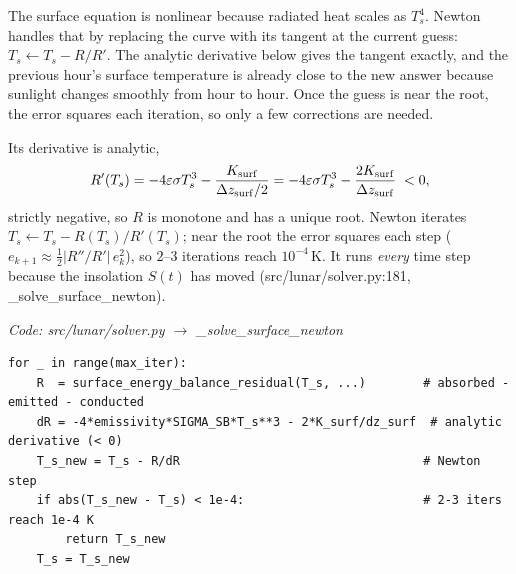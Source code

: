 \documentclass[11pt]{report}
\newcommand{\code}[1]{{\ttfamily\small #1}}
\begin{document}
\begin{plain}
The surface equation is nonlinear because radiated heat scales as $T_s^4$. Newton
handles that by replacing the curve with its tangent at the current guess:
$T_s\leftarrow T_s-R/R'$. The analytic derivative below gives the tangent
exactly, and the previous hour's surface temperature is already close to the new
answer because sunlight changes smoothly from hour to hour. Once the guess is
near the root, the error squares each iteration, so only a few corrections are
needed.
\end{plain}

Its derivative is analytic,
\[
R'(T_s)=-4\varepsilon\sigma T_s^3-\frac{K_{\rm surf}}{\Delta z_{\rm surf}/2}
=-4\varepsilon\sigma T_s^3-\frac{2K_{\rm surf}}{\Delta z_{\rm surf}}\;<0,
\]
strictly negative, so $R$ is monotone and has a unique root. Newton iterates
$T_s\leftarrow T_s-R(T_s)/R'(T_s)$; near the root the error squares each step
($e_{k+1}\approx\tfrac12|R''/R'|\,e_k^2$), so $2$--$3$ iterations reach
$10^{-4}$\,K. It runs \emph{every} time step because the insolation $S(t)$ has
moved (\code{src/lunar/solver.py:181}, \code{\_solve\_surface\_newton}).

{\small\color{dim}\textit{Code: \code{src/lunar/solver.py} $\to$ \code{\_solve\_surface\_newton}}}
\begin{lstlisting}[style=py]
for _ in range(max_iter):
    R  = surface_energy_balance_residual(T_s, ...)        # absorbed - emitted - conducted
    dR = -4*emissivity*SIGMA_SB*T_s**3 - 2*K_surf/dz_surf  # analytic derivative (< 0)
    T_s_new = T_s - R/dR                                  # Newton step
    if abs(T_s_new - T_s) < 1e-4:                         # 2-3 iters reach 1e-4 K
        return T_s_new
    T_s = T_s_new
\end{lstlisting}
\end{document}
